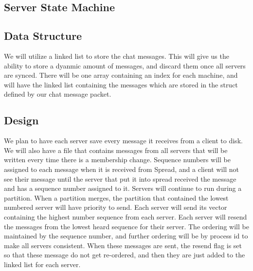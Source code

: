 \documentclass[12pt,journal,compsoc]{IEEEtran}
\begin{document}
\subsection{Server State Machine}
\begin{center}
\end{center}
\subsection{Data Structure}
We will utilize a linked list to store the chat messages.  This will give us the ability to store a dyanmic amount of messages, and discard them once all servers are synced.  There will be one array containing an index for each machine, and will have the linked list containing the messages which are stored in the struct defined by our chat message packet.
\subsection{Design}
We plan to have each server save every message it receives from a client to disk.  We will also have a file that contains messages from all servers that will be written every time there is a membership change.  Sequence numbers will be assigned to each message when it is received from Spread, and a client will not see their message until the server that put it into spread received the message and has a sequence number assigned to it.  Servers will continue to run during a partition.  When a partition merges, the partition that contained the lowest numbered server will have priority to send.  Each server will send its vector containing the highest number sequence from each server.  Each server will resend the messages from the lowest heard sequence for their server.  The ordering will be maintained by the sequence number, and further ordering will be by process id to make all servers consistent.  When these messages are sent, the resend flag is set so that these message do not get re-ordered, and then they are just added to the linked list for each server.\\
\end{document}
